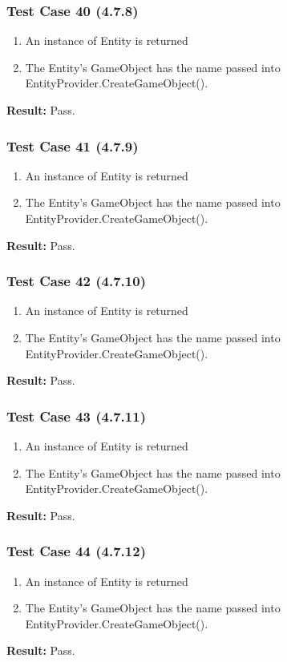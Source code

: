 \documentclass[a4paper,12pt]{article}
\begin{document}
		\subsubsection{Test Case 40 (4.7.8)}
				\begin{enumerate}
					\item An instance of Entity is returned
					\item The Entity’s GameObject has the name passed into EntityProvider.CreateGameObject().
				\end{enumerate}
			\textbf{Result: }Pass.
		\subsubsection{Test Case 41 (4.7.9)}
				\begin{enumerate}
					\item An instance of Entity is returned
					\item The Entity’s GameObject has the name passed into EntityProvider.CreateGameObject().
				\end{enumerate}
			\textbf{Result: }Pass.
		\subsubsection{Test Case 42 (4.7.10)}
				\begin{enumerate}
					\item An instance of Entity is returned
					\item The Entity’s GameObject has the name passed into EntityProvider.CreateGameObject().
				\end{enumerate}
			\textbf{Result: }Pass.
		\subsubsection{Test Case 43 (4.7.11)}
				\begin{enumerate}
					\item An instance of Entity is returned
					\item The Entity’s GameObject has the name passed into EntityProvider.CreateGameObject().
				\end{enumerate}
			\textbf{Result: }Pass.
		\subsubsection{Test Case 44 (4.7.12)}
				\begin{enumerate}
					\item An instance of Entity is returned
					\item The Entity’s GameObject has the name passed into EntityProvider.CreateGameObject().
				\end{enumerate}
			\textbf{Result: }Pass.
\end{document}
